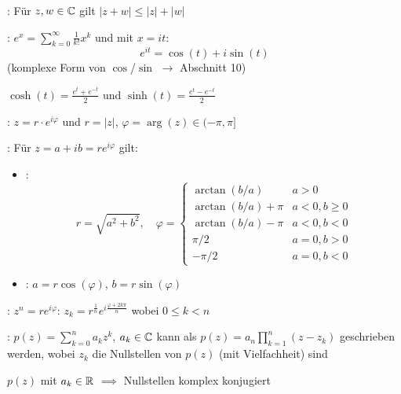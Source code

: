\Satz {}: Für $z, w \in \mathbb{C}$ gilt $|z + w|\le |z| + |w|$

\Satz {}: $e^x = \sum_{k=0}^{\infty}\frac{1}{k!}x^k$ und mit $x = it$:
$$e^{it} = \cos(t) + i\sin(t)$$
(komplexe Form von $\cos$/$\sin$ $\to$ Abschnitt 10)

\Def $\cosh(t) = \frac{e^t + e^{-t}}{2}$ und $\sinh(t) = \frac{e^t - e^{-t}}{2}$

\Def {}: $z = r \cdot e^{i\varphi}$ und $r = |z|$, $\varphi = \arg(z) \in (-\pi, \pi]$

\Satz {}: Für $z = a + ib = r e^{i\varphi}$ gilt:
\vspace{-0.6em}
\begin{itemize}
    \item {}:
    $$r = \sqrt{a^2+b^2}, \quad \varphi = \begin{cases}
        \arctan(b/a) & a > 0 \\
        \arctan(b/a) + \pi & a < 0, b \ge 0 \\
        \arctan(b/a) - \pi & a < 0, b < 0 \\
        \pi/2 & a = 0, b > 0 \\
        -\pi/2 & a = 0, b < 0
    \end{cases}$$
    \item {}: $a = r\cos(\varphi)$, $b = r\sin(\varphi)$
\end{itemize}

\Satz {}: $z^n = re^{i\varphi}$:
$z_k = r^{\frac{1}{n}}e^{i\frac{\varphi + 2k\pi}{n}}$ wobei $0\le k < n$

\Satz {}: $p(z) = \sum_{k=0}^{n} a_k z^k$, $a_k \in \mathbb{C}$
kann als $p(z) = a_n\prod_{k=1}^{n}(z-z_k)$ geschrieben werden, wobei $z_k$ die Nullstellen
von $p(z)$ (mit Vielfachheit) sind

\Satz $p(z)$ mit $a_k \in \mathbb{R}$ $\implies$ Nullstellen komplex konjugiert